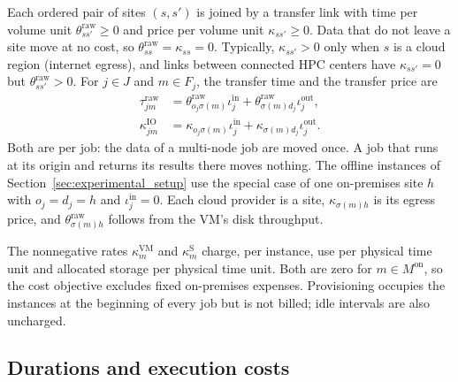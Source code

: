 \documentclass[conference]{IEEEtran}
\begin{document}
Each ordered pair of sites $(s,s')$ is joined by a transfer link with time per volume unit $\theta_{ss'}^{\mathrm{raw}}\geq0$ and price per volume unit $\kappa_{ss'}\geq0$. Data that do not leave a site move at no cost, so $\theta_{ss}^{\mathrm{raw}}=\kappa_{ss}=0$. Typically, $\kappa_{ss'}>0$ only when $s$ is a cloud region (internet egress), and links between connected HPC centers have $\kappa_{ss'}=0$ but $\theta_{ss'}^{\mathrm{raw}}>0$. For $j\in J$ and $m\in F_j$, the transfer time and the transfer price are
\begin{align}
 \tau_{jm}^{\mathrm{raw}}&=\theta_{o_j\sigma(m)}^{\mathrm{raw}}\iota_j^{\mathrm{in}}+\theta_{\sigma(m)d_j}^{\mathrm{raw}}\iota_j^{\mathrm{out}},\\
 \kappa_{jm}^{\mathrm{IO}}&=\kappa_{o_j\sigma(m)}\iota_j^{\mathrm{in}}+\kappa_{\sigma(m)d_j}\iota_j^{\mathrm{out}}.
\end{align}
Both are per job: the data of a multi-node job are moved once. A job that runs at its origin and returns its results there moves nothing. The offline instances of Section~\ref{sec:experimental_setup} use the special case of one on-premises site $h$ with $o_j=d_j=h$ and $\iota_j^{\mathrm{in}}=0$. Each cloud provider is a site, $\kappa_{\sigma(m)h}$ is its egress price, and $\theta_{\sigma(m)h}^{\mathrm{raw}}$ follows from the VM's disk throughput.

The nonnegative rates $\kappa_m^{\mathrm{VM}}$ and $\kappa_m^{\mathrm{S}}$ charge, per instance, use per physical time unit and allocated storage per physical time unit. Both are zero for $m\in M^{\mathrm{on}}$, so the cost objective excludes fixed on-premises expenses. Provisioning occupies the instances at the beginning of every job but is not billed; idle intervals are also uncharged.

\subsection{Durations and execution costs}
\end{document}
